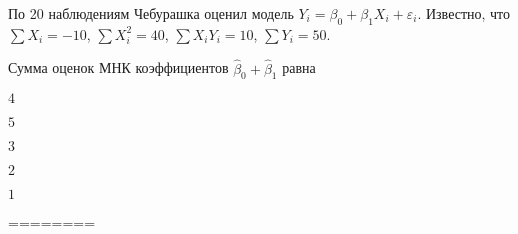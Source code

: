 
\begin{question}
По 20 наблюдениям Чебурашка оценил модель
\(Y_i = \beta_0 + \beta_1 X_i + \varepsilon_i\). Известно, что
\(\sum X_i = -10\), \(\sum X_i^2 = 40\), \(\sum X_i Y_i = 10\),
\(\sum Y_i = 50\).

Сумма оценок МНК коэффициентов \(\hat \beta_0 + \hat \beta_1\) равна
\begin{answerlist}
  \item \(4\)
  \item \(5\)
  \item \(3\)
  \item \(2\)
  \item \(1\)
\end{answerlist}
\end{question}

\begin{solution}
========
\end{solution}

